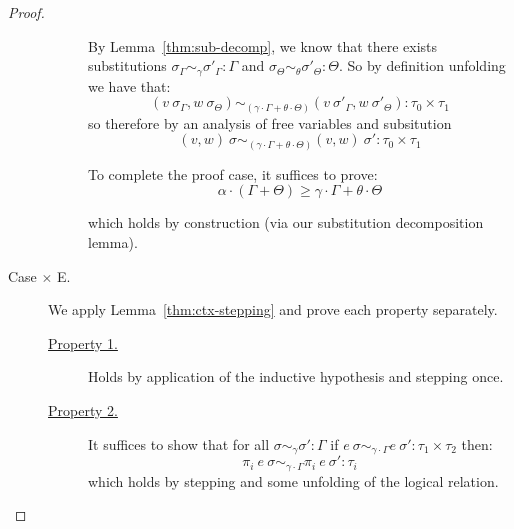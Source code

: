 \begin{proof}
\begin{description}
\begin{description}
          By Lemma~\ref{thm:sub-decomp}, we know that there exists substitutions
          $\sigma_{\Gamma} \sim_{\gamma} \sigma'_{\Gamma} : \Gamma$
          and
          $\sigma_{\Theta} \sim_{\theta} \sigma'_{\Theta} : \Theta$.
          So by definition unfolding we have that:
          $$
          (v~\sigma_{\Gamma}, w~\sigma_{\Theta}) 
            \sim_{(\gamma \cdot \Gamma + \theta \cdot \Theta)} 
          (v~\sigma'_{\Gamma}, w~\sigma'_{\Theta})
          : \tau_0 \times \tau_1
          $$
          so therefore by an analysis of free variables and subsitution
          $$
          (v, w)~\sigma 
            \sim_{(\gamma \cdot \Gamma + \theta \cdot \Theta)} 
          (v, w)~\sigma'
          : \tau_0 \times \tau_1
          $$

          To complete the proof case, it suffices to prove:
          $$\alpha \cdot (\Gamma + \Theta) \geq \gamma \cdot \Gamma + \theta \cdot \Theta$$

          which holds by construction (via our substitution decomposition lemma).
      \end{description}

    \item[Case $\times$ E.] 
      We apply Lemma~\ref{thm:ctx-stepping} and prove each property separately.
      \begin{description}
        \item[\underline{Property 1.}]
          Holds by application of the inductive hypothesis and stepping once.
        \item[\underline{Property 2.}]
          It suffices to show that for all $\sigma \sim_{\gamma} \sigma' : \Gamma$
          if $e~\sigma \sim_{\gamma \cdot \Gamma} e~\sigma' : \tau_1 \times \tau_2$
          then:
          $$
          \pi_i~e~\sigma \sim_{\gamma \cdot \Gamma} \pi_i~e~\sigma' : \tau_i
          $$
          which holds by stepping and some unfolding of the logical relation.
      \end{description}


\end{description}
\end{proof}
